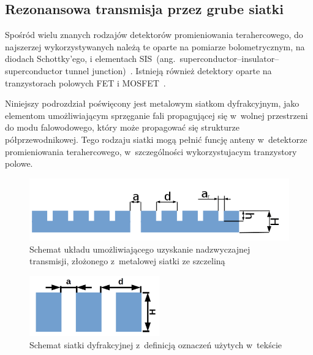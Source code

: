 \subsection{Rezonansowa transmisja przez grube siatki}
Spośród wielu znanych rodzajów detektorów promieniowania terahercowego, do najszerzej wykorzystywanych należą te oparte na pomiarze bolometrycznym, na diodach Schottky'ego, i elementach SIS~(ang.~superconductor–insulator–superconductor tunnel junction)~\cite{sizov2010thz}. Istnieją również detektory oparte na tranzystorach polowych FET i MOSFET~\cite{knap2002nonresonant,kopyt2015parasitic}.

Niniejszy podrozdział poświęcony jest metalowym siatkom dyfrakcyjnym, jako elementom umożliwiającym sprzęganie fali propagującej się w~wolnej przestrzeni do modu falowodowego, który może propagować się strukturze półprzewodnikowej. Tego rodzaju siatki mogą pełnić funcję anteny w~detektorze promieniowania terahercowego, w~szczególności wykorzystujacym tranzystory polowe. 
\label{subart:rezo-grating}

\begin{figure}[htb]
	\centering
	\includegraphics[width=1.0\textwidth]{images/thz/schemat-1szczelina.png}
	\caption{Schemat układu umożliwiającego uzyskanie nadzwyczajnej transmisji, złożonego z~metalowej siatki ze szczeliną}
	\label{fig:szczelina-schem}
\end{figure}

\begin{figure}
	\includegraphics[width=0.5\textwidth]{images/thz/schemat-siatka.png}
	\caption{Schemat siatki dyfrakcyjnej z~definicją oznaczeń użytych w~tekście}
	\centering
	\label{fig:rezo-siat-H}
\end{figure}

